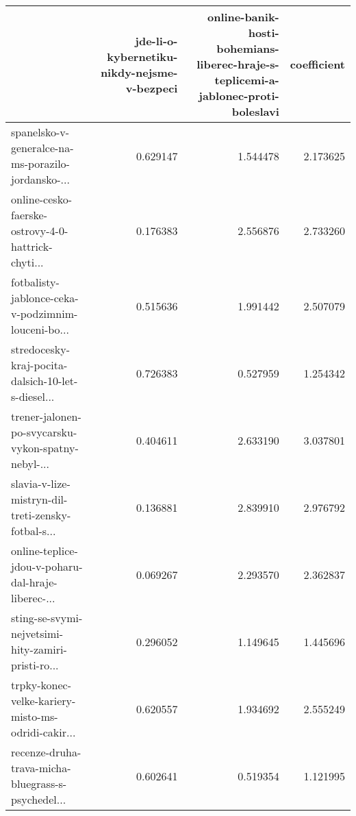 \begin{tabular}{lrrr}
\toprule
{} &  jde-li-o-kybernetiku-nikdy-nejsme-v-bezpeci &  online-banik-hosti-bohemians-liberec-hraje-s-teplicemi-a-jablonec-proti-boleslavi &  coefficient \\
\midrule
spanelsko-v-generalce-na-ms-porazilo-jordansko-... &                                     0.629147 &                                           1.544478 &     2.173625 \\
online-cesko-faerske-ostrovy-4-0-hattrick-chyti... &                                     0.176383 &                                           2.556876 &     2.733260 \\
fotbalisty-jablonce-ceka-v-podzimnim-louceni-bo... &                                     0.515636 &                                           1.991442 &     2.507079 \\
stredocesky-kraj-pocita-dalsich-10-let-s-diesel... &                                     0.726383 &                                           0.527959 &     1.254342 \\
trener-jalonen-po-svycarsku-vykon-spatny-nebyl-... &                                     0.404611 &                                           2.633190 &     3.037801 \\
slavia-v-lize-mistryn-dil-treti-zensky-fotbal-s... &                                     0.136881 &                                           2.839910 &     2.976792 \\
online-teplice-jdou-v-poharu-dal-hraje-liberec-... &                                     0.069267 &                                           2.293570 &     2.362837 \\
sting-se-svymi-nejvetsimi-hity-zamiri-pristi-ro... &                                     0.296052 &                                           1.149645 &     1.445696 \\
trpky-konec-velke-kariery-misto-ms-odridi-cakir... &                                     0.620557 &                                           1.934692 &     2.555249 \\
recenze-druha-trava-micha-bluegrass-s-psychedel... &                                     0.602641 &                                           0.519354 &     1.121995 \\
\bottomrule
\end{tabular}
